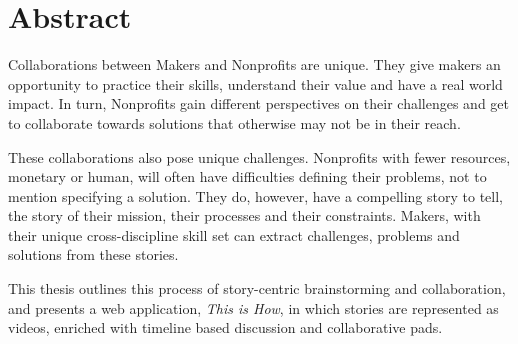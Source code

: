 \begingroup
\let\clearpage\relax
\let\cleardoublepage\relax
\let\cleardoublepage\relax

\chapter*{Abstract}

Collaborations between Makers and Nonprofits are unique. They give makers an opportunity to practice their skills, understand their value and have a real world impact. In turn, Nonprofits gain different perspectives on their challenges and get to collaborate towards solutions that otherwise may not be in their reach. 

These collaborations also pose unique challenges. Nonprofits with fewer resources, monetary or human, will often have difficulties defining their problems, not to mention specifying a solution. They do, however, have a compelling story to tell, the story of their mission, their processes and their constraints. Makers, with their unique cross-discipline skill set can extract challenges, problems and solutions from these stories.

This thesis outlines this process of story-centric brainstorming and collaboration, and presents a web application, \textit{This is How}, in which stories are represented as videos, enriched with timeline based discussion and collaborative pads.  

\endgroup			

\vfill